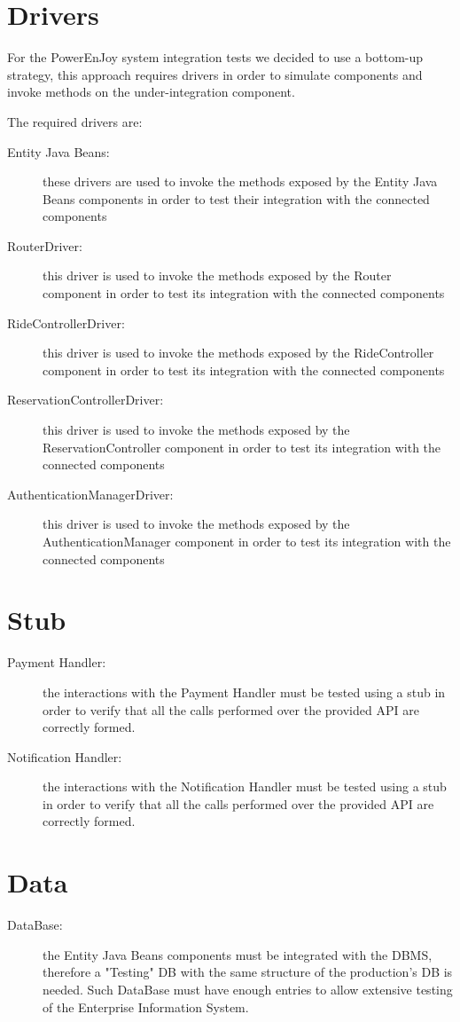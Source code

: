 \section{Drivers}
For the PowerEnJoy system integration tests we decided to use a bottom-up strategy, this approach requires drivers in order to simulate components and invoke methods on the under-integration component.

The required drivers are:
\begin{description}
	\item [Entity Java Beans: ] these drivers are used to invoke the methods exposed by the Entity Java Beans components in order to test their integration with the connected components
	\item [RouterDriver: ] this driver is used to invoke the methods exposed by the Router component in order to test its integration with the connected components
	\item [RideControllerDriver: ] this driver is used to invoke the methods exposed by the RideController component in order to test its integration with the connected components
	\item [ReservationControllerDriver: ] this driver is used to invoke the methods exposed by the ReservationController component in order to test its integration with the connected components
	\item [AuthenticationManagerDriver: ] this driver is used to invoke the methods exposed by the AuthenticationManager component in order to test its integration with the connected components
\end{description}

\section{Stub}
\begin{description}
	\item [Payment Handler: ] the interactions with the Payment Handler must be tested using a stub in order to verify that all the calls performed over the provided API are correctly formed.
	\item [Notification Handler: ] the interactions with the Notification Handler must be tested using a stub in order to verify that all the calls performed over the provided API are correctly formed.
\end{description}

\section{Data}
\begin{description}
	\item [DataBase: ] the Entity Java Beans components must be integrated with the DBMS, therefore a "Testing" DB with the same structure of the production's DB is needed. Such DataBase must have enough entries to allow extensive testing of the Enterprise Information System.
\end{description}